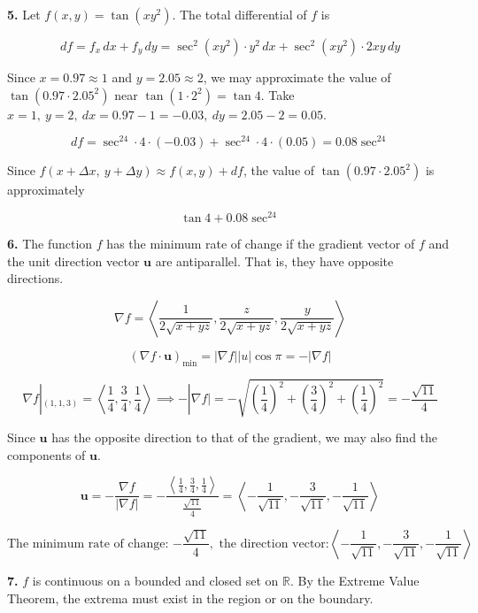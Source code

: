 \documentclass{article}
\begin{document}
\vspace{1em}

\textbf{5.} Let $f(x,y)=\tan\left(xy^2\right)$. The total differential of $f$ is

\[df=f_x\,dx+f_y\,dy=\sec^2\left(xy^2\right)\cdot y^2\,dx+\sec^2\left(xy^2\right)\cdot2xy\,dy\]

Since $x=0.97\approx1$ and $y=2.05\approx2$, we may approximate the value of $\tan\left(0.97\cdot2.05^2\right)$ near $\tan\left(1\cdot 2^2\right)=\tan4$. Take $x=1,\:y=2,\:dx=0.97-1=-0.03,\:dy=2.05-2=0.05$.

\[df=\sec^24\cdot4\cdot(-0.03)+\sec^24\cdot4\cdot(0.05)=0.08\sec^24\]

Since $f(x+\Delta x,\:y+\Delta y)\approx f(x,y)+df$, the value of $\tan\left(0.97\cdot2.05^2\right)$ is approximately

\[\boxed{\tan4+0.08\sec^24}\]

\vspace{1em}

\textbf{6.} The function $f$ has the minimum rate of change if the gradient vector of $f$ and the unit direction vector $\mathbf u$ are antiparallel. That is, they have opposite directions.

\[\nabla f=\left\langle\frac1{2\sqrt{x+yz}},\frac z{2\sqrt{x+yz}},\frac y{2\sqrt{x+yz}}\right\rangle\]

\[\left(\nabla f\cdot \mathbf u\right)_{\text{min}}=\left|\nabla f\right||u|\cos\pi=-|\nabla f|\]

\[\nabla f|_{(1,1,3)}=\left\langle\frac14,\frac34,\frac14\right\rangle\implies-|\nabla f|=-\sqrt{\left(\frac14\right)^2+\left(\frac34\right)^2+\left(\frac14\right)^2}=-\frac{\sqrt{11}}4\]

Since $\mathbf u$ has the opposite direction to that of the gradient, we may also find the components of $\mathbf u$.

\[\mathbf{u}=-\frac{\nabla f}{|\nabla f|}=-\frac{\left\langle\frac14,\frac34,\frac14\right\rangle}{\frac{\sqrt{11}}4}=\left\langle-\frac1{\sqrt{11}},-\frac3{\sqrt{11}},-\frac1{\sqrt{11}}\right\rangle\]

\[\boxed{\text{The minimum rate of change: }{-\frac{\sqrt{11}}4},\text{ the direction vector:}\left\langle-\frac1{\sqrt{11}},-\frac3{\sqrt{11}},-\frac1{\sqrt{11}}\right\rangle}\]

\vspace{1em}

\textbf{7.} $f$ is continuous on a bounded and closed set on $\mathbb R$. By the Extreme Value Theorem, the extrema must exist in the region or on the boundary.
\end{document}
